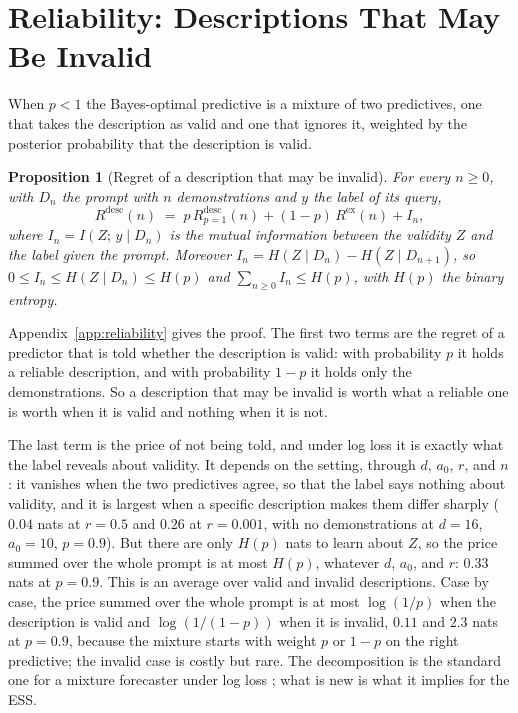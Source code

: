 \documentclass{article}
\newtheorem{proposition}[theorem]{Proposition}
\begin{document}
\section{Reliability: Descriptions That May Be Invalid}\label{sec:reliability}
When $p < 1$ the Bayes-optimal predictive is a mixture of two predictives, one that takes the description as valid and one that ignores it, weighted by the posterior probability that the description is valid.

\begin{proposition}[Regret of a description that may be invalid]\label{prop:unreliable}
For every $n \ge 0$, with $D_n$ the prompt with $n$ demonstrations and $y$ the label of its query,
\begin{equation}\label{eq:decomp}
    R^{\mathrm{desc}}(n) \;=\; p\, R^{\mathrm{desc}}_{p=1}(n) + (1-p)\, R^{\mathrm{ex}}(n) + I_n,
\end{equation}
where $I_n = I(Z;\, y \mid D_n)$ is the mutual information between the validity $Z$ and the label given the prompt. Moreover $I_n = H(Z \mid D_n) - H(Z \mid D_{n+1})$, so $0 \le I_n \le H(Z \mid D_n) \le H(p)$ and $\sum_{n \ge 0} I_n \le H(p)$, with $H(p)$ the binary entropy.
\end{proposition}
Appendix~\ref{app:reliability} gives the proof. The first two terms are the regret of a predictor that is told whether the description is valid: with probability $p$ it holds a reliable description, and with probability $1-p$ it holds only the demonstrations. So a description that may be invalid is worth what a reliable one is worth when it is valid and nothing when it is not.

The last term is the price of not being told, and under log loss it is exactly what the label reveals about validity. It depends on the setting, through $d$, $a_0$, $r$, and $n$: it vanishes when the two predictives agree, so that the label says nothing about validity, and it is largest when a specific description makes them differ sharply ($0.04$ nats at $r = 0.5$ and $0.26$ at $r = 0.001$, with no demonstrations at $d = 16$, $a_0 = 10$, $p = 0.9$). But there are only $H(p)$ nats to learn about $Z$, so the price summed over the whole prompt is at most $H(p)$, whatever $d$, $a_0$, and $r$: $0.33$ nats at $p = 0.9$. This is an average over valid and invalid descriptions. Case by case, the price summed over the whole prompt is at most $\log(1/p)$ when the description is valid and $\log(1/(1-p))$ when it is invalid, $0.11$ and $2.3$ nats at $p = 0.9$, because the mixture starts with weight $p$ or $1-p$ on the right predictive; the invalid case is costly but rare. The decomposition is the standard one for a mixture forecaster under log loss \citep{cesabianchi2006, merhav1998}; what is new is what it implies for the ESS.
\end{document}
